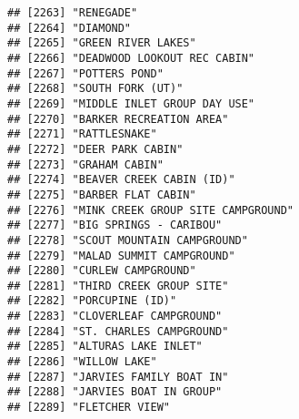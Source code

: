 \documentclass[
]{article}
\begin{document}
\begin{verbatim}
## [2263] "RENEGADE"                                                                            
## [2264] "DIAMOND"                                                                             
## [2265] "GREEN RIVER LAKES"                                                                   
## [2266] "DEADWOOD LOOKOUT REC CABIN"                                                          
## [2267] "POTTERS POND"                                                                        
## [2268] "SOUTH FORK (UT)"                                                                     
## [2269] "MIDDLE INLET GROUP DAY USE"                                                          
## [2270] "BARKER RECREATION AREA"                                                              
## [2271] "RATTLESNAKE"                                                                         
## [2272] "DEER PARK CABIN"                                                                     
## [2273] "GRAHAM CABIN"                                                                        
## [2274] "BEAVER CREEK CABIN (ID)"                                                             
## [2275] "BARBER FLAT CABIN"                                                                   
## [2276] "MINK CREEK GROUP SITE CAMPGROUND"                                                    
## [2277] "BIG SPRINGS - CARIBOU"                                                               
## [2278] "SCOUT MOUNTAIN CAMPGROUND"                                                           
## [2279] "MALAD SUMMIT CAMPGROUND"                                                             
## [2280] "CURLEW CAMPGROUND"                                                                   
## [2281] "THIRD CREEK GROUP SITE"                                                              
## [2282] "PORCUPINE (ID)"                                                                      
## [2283] "CLOVERLEAF CAMPGROUND"                                                               
## [2284] "ST. CHARLES CAMPGROUND"                                                              
## [2285] "ALTURAS LAKE INLET"                                                                  
## [2286] "WILLOW LAKE"                                                                         
## [2287] "JARVIES FAMILY BOAT IN"                                                              
## [2288] "JARVIES BOAT IN GROUP"                                                               
## [2289] "FLETCHER VIEW"                                                                       

\end{verbatim}
\end{document}
